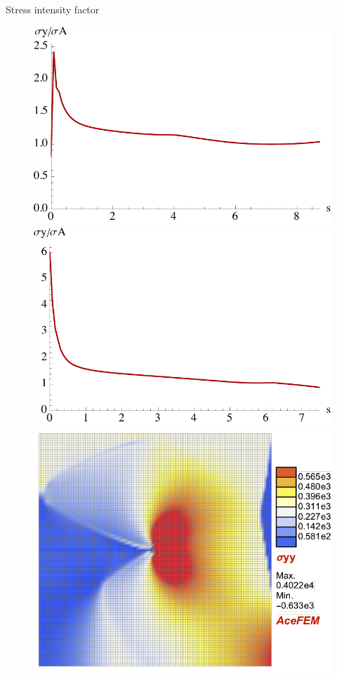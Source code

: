 \documentclass[aspectratio=169,xcolor=dvipsnames]{beamer}
\begin{document}
\begin{frame}{Stress intensity factor}
\begin{figure}
\begin{minipage}{0.35\linewidth}
		\begin{minipage}[c]{0.5\linewidth}
		\includegraphics[width=\linewidth]{K_L8.pdf}
	\end{minipage}\hfill
	\begin{minipage}[c]{0.5\linewidth}
		\includegraphics[width=\linewidth]{K_L4.pdf}
	\end{minipage}\hfill
		\begin{minipage}[c]{0.5\linewidth}
				\includegraphics[width=\linewidth]{sigmayy_L2.pdf}

\end{minipage}
\end{minipage}
\end{figure}
\end{frame}
\end{document}
